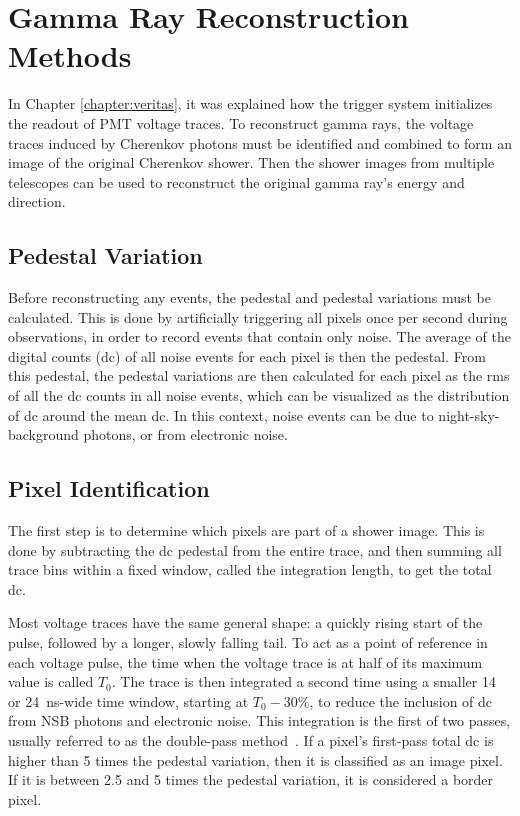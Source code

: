 \cleartooddpage[\thispagestyle{empty}]

\chapter{Gamma Ray Reconstruction Methods}\label{ch:grrecon}

In Chapter \ref{chapter:veritas}, it was explained how the trigger system initializes the readout of PMT voltage traces.
To reconstruct gamma rays, the voltage traces induced by Cherenkov photons must be identified and combined to form an image of the original Cherenkov shower.
Then the shower images from multiple telescopes can be used to reconstruct the original gamma ray's energy and direction.

\section{Pedestal Variation}
  Before reconstructing any events, the pedestal and pedestal variations must be calculated.
  This is done by artificially triggering all pixels once per second during observations, in order to record events that contain only noise.
  The average of the digital counts (dc) of all noise events for each pixel is then the pedestal.
  From this pedestal, the pedestal variations are then calculated for each pixel as the rms of all the dc counts in all noise events, which can be visualized as the distribution of dc around the mean dc.
  In this context, noise events can be due to night-sky-background photons, or from electronic noise.

\section{Pixel Identification}
  The first step is to determine which pixels are part of a shower image.
  This is done by subtracting the dc pedestal from the entire trace, and then summing all trace bins within a fixed window, called the integration length, to get the total dc.

  Most voltage traces have the same general shape: a quickly rising start of the pulse, followed by a longer, slowly falling tail.
  To act as a point of reference in each voltage pulse, the time when the voltage trace is at half of its maximum value is called $T_{0}$.
  The trace is then integrated a second time using a smaller 14 or \SI{24}{ns}-wide time window, starting at $T_0 - 30\%$, to reduce the inclusion of dc from NSB photons and electronic noise.
  This integration is the first of two passes, usually referred to as the double-pass method~\cite{doublepass}.
  If a pixel's first-pass total dc is higher than 5 times the pedestal variation, then it is classified as an image pixel.
  If it is between 2.5 and 5 times the pedestal variation, it is considered a border pixel.

